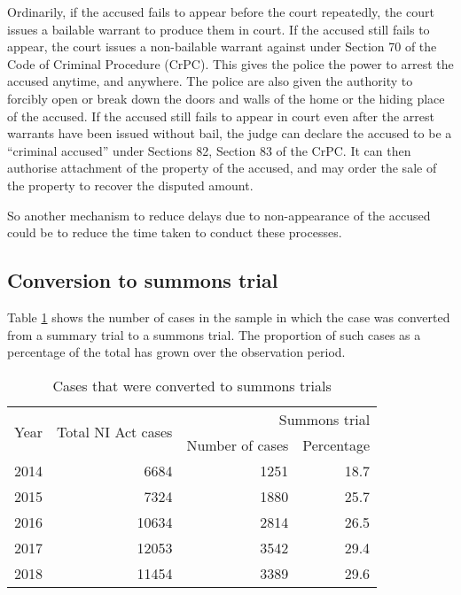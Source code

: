 Ordinarily, if the accused fails to appear before the court repeatedly, the court issues a bailable warrant to produce them in court. If the accused still fails to appear, the court issues a non-bailable warrant against under Section 70 of the Code of Criminal Procedure (CrPC). This gives the police the power to arrest the accused anytime, and anywhere. The police are also given the authority to forcibly open or break down the doors and walls of the home or the hiding place of the accused. If the accused still fails to appear in court even after the arrest warrants have been issued without bail, the judge can declare the accused to be a ``criminal accused'' under Sections 82, Section 83 of the CrPC. It can then authorise attachment of the property of the accused, and may order the sale of the property to recover the disputed amount.

So another mechanism to reduce delays due to non-appearance of the accused could be to reduce the time taken to conduct these processes. %

\subsection{Conversion to summons trial}
\label{sec:conv -summ-trial-1}

Table \ref{tab:summons_yearWise} shows the number of cases in the sample in which the case was converted from a summary trial to a summons trial. The proportion of such cases as a percentage of the total has grown over the observation period.

\begin{longtable}[h!]{@{}lrrr@{}}
  \caption{Cases that were converted to summons trials}\label{tab:summons_yearWise}\\
\toprule
\multirow{2}{*}{Year} &  \multirow{2}{*}{Total NI Act cases} & \multicolumn{2}{p{4cm}}{Summons trial}\\
\cmidrule{3-4}
&& Number of cases & Percentage \\
\midrule\endhead
2014 &   6684 &  1251 &  18.7 \\
2015 &   7324 &  1880 &  25.7 \\
2016 &  10634 &  2814 &  26.5 \\
2017 &  12053 &  3542 &  29.4 \\
2018 &  11454 &  3389 &  29.6 \\
\bottomrule
\end{longtable}


